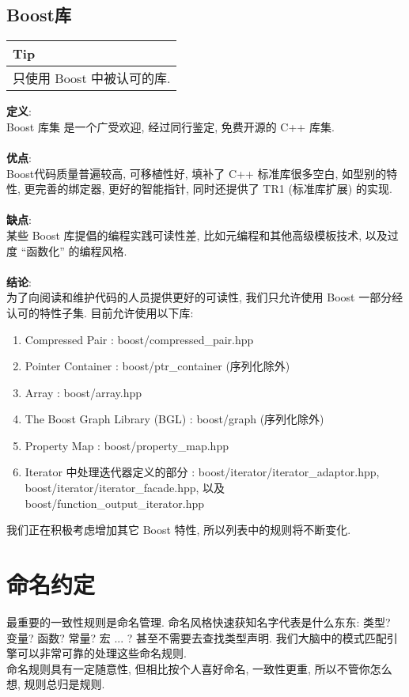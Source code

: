 \documentclass[a4paper,11pt,CJK]{article}
\begin{document}
\begin{CJK}{UTF8}{gbsn}
\subsection{Boost库}
\begin{table}[htbp]
\flushleft
\begin{tabular}{p{400pt}}
\toprule
\rowcolor[gray]{.8} Tip \\
\midrule
只使用 Boost 中被认可的库.\\
\bottomrule
\end{tabular}
\end{table}
\noindent
\textbf{定义}:\\
\indent Boost 库集 是一个广受欢迎, 经过同行鉴定, 免费开源的 C++ 库集.\\
\\
\textbf{优点}:\\
\indent Boost代码质量普遍较高, 可移植性好, 填补了 C++ 标准库很多空白, 如型别的特性, 更完善的绑定器, 更好的智能指针, 同时还提供了 TR1 (标准库扩展) 的实现.\\
\\
\textbf{缺点}:\\
\indent 某些 Boost 库提倡的编程实践可读性差, 比如元编程和其他高级模板技术, 以及过度 ``函数化'' 的编程风格.\\
\\
\textbf{结论}:\\
\indent 为了向阅读和维护代码的人员提供更好的可读性, 我们只允许使用 Boost 一部分经认可的特性子集. 目前允许使用以下库:
\begin{enumerate}
\item
Compressed Pair : boost/compressed\_pair.hpp
\item
Pointer Container : boost/ptr\_container (序列化除外)
\item
Array : boost/array.hpp
\item
The Boost Graph Library (BGL) : boost/graph (序列化除外)
\item
Property Map : boost/property\_map.hpp
\item
Iterator 中处理迭代器定义的部分 : boost/iterator/iterator\_adaptor.hpp, boost/iterator/iterator\_facade.hpp, 以及 boost/function\_output\_iterator.hpp
\end{enumerate}
\indent 我们正在积极考虑增加其它 Boost 特性, 所以列表中的规则将不断变化.
\newpage

\section{命名约定}
最重要的一致性规则是命名管理. 命名风格快速获知名字代表是什么东东: 类型? 变量? 函数? 常量? 宏 ... ? 甚至不需要去查找类型声明. 我们大脑中的模式匹配引擎可以非常可靠的处理这些命名规则.\\
\indent 命名规则具有一定随意性, 但相比按个人喜好命名, 一致性更重, 所以不管你怎么想, 规则总归是规则.


\end{CJK}
\end{document}
